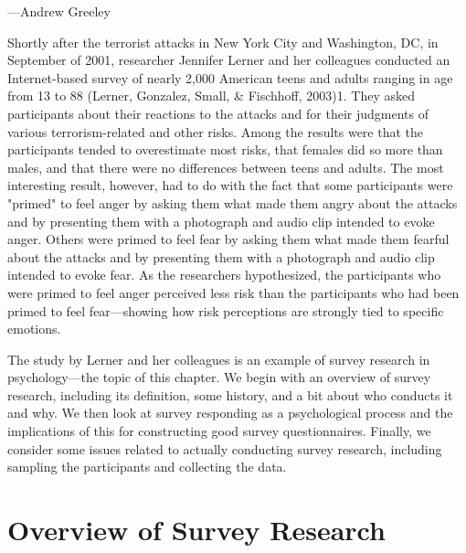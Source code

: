  {---Andrew Greeley}

Shortly after the terrorist attacks in New York City and Washington, DC, in September of 2001, researcher Jennifer Lerner and her colleagues conducted an Internet-based survey of nearly 2,000 American teens and adults ranging in age from 13 to 88 (Lerner, Gonzalez, Small, \& Fischhoff, 2003)1. They asked participants about their reactions to the attacks and for their judgments of various terrorism-related and other risks. Among the results were that the participants tended to overestimate most risks, that females did so more than males, and that there were no differences between teens and adults. The most interesting result, however, had to do with the fact that some participants were "primed" to feel anger by asking them what made them angry about the attacks and by presenting them with a photograph and audio clip intended to evoke anger. Others were primed to feel fear by asking them what made them fearful about the attacks and by presenting them with a photograph and audio clip intended to evoke fear. As the researchers hypothesized, the participants who were primed to feel anger perceived less risk than the participants who had been primed to feel fear---showing how risk perceptions are strongly tied to specific emotions.

The study by Lerner and her colleagues is an example of survey research in psychology---the topic of this chapter. We begin with an overview of survey research, including its definition, some history, and a bit about who conducts it and why. We then look at survey responding as a psychological process and the implications of this for constructing good survey questionnaires. Finally, we consider some issues related to actually conducting survey research, including sampling the participants and collecting the data.

\section{Overview of Survey Research}


